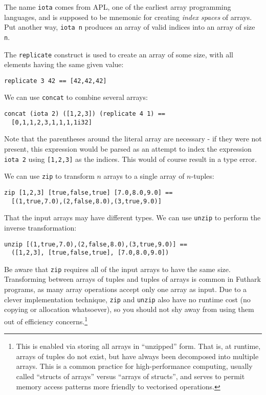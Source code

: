 \documentclass[oneside,11pt]{book}
\begin{document}
The name \texttt{iota} comes from APL, one of the earliest array
programming languages, and is supposed to be mnemonic for creating
\textit{index spaces} of arrays.  Put another way, \texttt{iota n}
produces an array of valid indices into an array of size \texttt{n}.

The \texttt{replicate} construct is used to create an array of some
size, with all elements having the same given value:

\begin{lstlisting}
replicate 3 42 == [42,42,42]
\end{lstlisting}

We can use \texttt{concat} to combine several arrays:

\begin{lstlisting}
concat (iota 2) ([1,2,3]) (replicate 4 1) ==
  [0,1,1,2,3,1,1,1,1i32]
\end{lstlisting}

Note that the parentheses around the literal array are necessary - if
they were not present, this expression would be parsed as an attempt
to index the expression \texttt{iota 2} using \texttt{[1,2,3]} as the
indices.  This would of course result in a type error.

We can use \texttt{zip} to transform $n$ arrays to a single array of
$n$-tuples:

\begin{lstlisting}
zip [1,2,3] [true,false,true] [7.0,8.0,9.0] ==
  [(1,true,7.0),(2,false,8.0),(3,true,9.0)]
\end{lstlisting}

That the input arrays may have different types.  We can use
\texttt{unzip} to perform the inverse transformation:

\begin{lstlisting}
unzip [(1,true,7.0),(2,false,8.0),(3,true,9.0)] ==
  ([1,2,3], [true,false,true], [7.0,8.0,9.0])
\end{lstlisting}

Be aware that \texttt{zip} requires all of the input arrays to have
the same size.  Transforming between arrays of tuples and tuples of
arrays is common in Futhark programs, as many array operations accept
only one array as input.  Due to a clever implementation technique,
\texttt{zip} and \texttt{unzip} also have no runtime cost (no copying
or allocation whatsoever), so you should not shy away from using them
out of efficiency concerns.\footnote{This is enabled via storing all
  arrays in ``unzipped'' form.  That is, at runtime, arrays of tuples
  do not exist, but have always been decomposed into multiple arrays.
  This is a common practice for high-performance computing, usually
  called ``structs of arrays'' versus ``arrays of structs'', and
  serves to permit memory access patterns more friendly to vectorised
  operations.}
\end{document}
